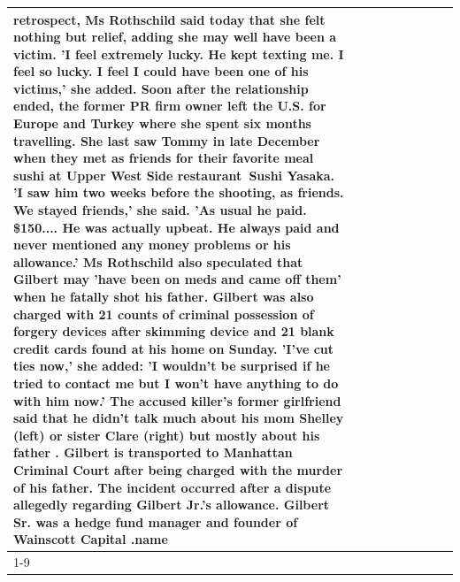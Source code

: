 \begin{table}[H]
\begin{tabular}{lllrlllll}
retrospect, Ms Rothschild said today that she felt nothing but relief, adding she may well have been a victim. 'I feel extremely lucky. He kept texting me. I feel so lucky. I feel I could have been one of his victims,' she added. Soon after the relationship ended, the former PR firm owner left the U.S. for Europe and Turkey where she spent six months  travelling. She last saw Tommy in late December when they met as friends for their favorite meal sushi at Upper West Side restaurant Sushi Yasaka. 'I saw him two weeks before the shooting, as friends. We stayed friends,' she said. 'As usual he paid. \$150.... He was actually upbeat. He always paid and never mentioned any money problems or his allowance.' Ms Rothschild also speculated that Gilbert may 'have been on meds and came off them' when he fatally shot his father. Gilbert was also charged with 21 counts of criminal possession of forgery devices after skimming device and 21 blank credit cards found at his home on Sunday. 'I've cut ties now,' she added: 'I wouldn’t be surprised if he tried to contact me but I won’t have anything to do with him now.' The accused killer's former girlfriend said that he didn't talk much about his mom Shelley (left) or sister Clare (right) but mostly about his father . Gilbert is transported to Manhattan Criminal Court  after being charged with the murder of his father. The incident occurred after a dispute allegedly regarding Gilbert Jr.'s allowance. Gilbert Sr. was a hedge fund manager and founder of Wainscott Capital .name \\
\cline{1-9}

\end{tabular}
\end{table}
